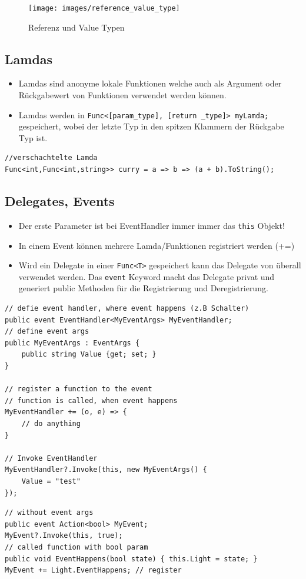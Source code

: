 \begin{figure}[h!]
\centering
\texttt{[image: images/reference\_value\_type]}
\caption{Referenz und Value Typen}
\label{fig:valuetypes}
\end{figure}

\clearpage

\subsection{Lamdas}
\begin{itemize}
	\item Lamdas sind anonyme lokale Funktionen welche auch als Argument oder Rückgabewert von Funktionen verwendet werden können.
	\item Lamdas werden in \lstinline|Func<[param_type], [return _type]> myLamda;| gespeichert, wobei der letzte Typ in den spitzen Klammern der Rückgabe Typ ist.
\end{itemize}

\begin{lstlisting}
//verschachtelte Lamda
Func<int,Func<int,string>> curry = a => b => (a + b).ToString();
\end{lstlisting}

\subsection{Delegates, Events}
\begin{itemize}
	\item Der erste Parameter ist bei EventHandler immer immer das \lstinline|this| Objekt!
	\item In einem Event können mehrere Lamda/Funktionen registriert werden (+=)
	\item Wird ein Delegate in einer \lstinline|Func<T>| gespeichert kann das Delegate von überall verwendet werden. Das \lstinline|event| Keyword macht das Delegate privat und generiert public Methoden für die Registrierung und Deregistrierung.
\end{itemize}

\begin{lstlisting}
// defie event handler, where event happens (z.B Schalter)
public event EventHandler<MyEventArgs> MyEventHandler;
// define event args
public MyEventArgs : EventArgs {
	public string Value {get; set; }
}

// register a function to the event
// function is called, when event happens
MyEventHandler += (o, e) => {
	// do anything
}

// Invoke EventHandler
MyEventHandler?.Invoke(this, new MyEventArgs() {
	Value = "test"
});
\end{lstlisting}
\begin{lstlisting}
// without event args
public event Action<bool> MyEvent;
MyEvent?.Invoke(this, true);
// called function with bool param
public void EventHappens(bool state) { this.Light = state; }
MyEvent += Light.EventHappens; // register
\end{lstlisting}

